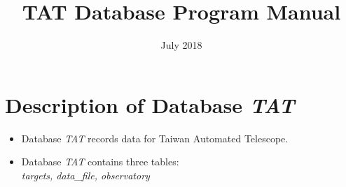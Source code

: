 \documentclass[12pt]{article}    %
\title{TAT Database Program Manual}  %
\date{July 2018}
\begin{document}
 \maketitle     %
 \newpage		 
	
 \tableofcontents	  %
 \newpage    
		
 \section{Description of Database {\it TAT}}

 \begin{itemize}
  \item Database {\it TAT} records data for Taiwan Automated Telescope.
  \item Database {\it TAT} contains three tables:\\
   {\it targets, data\_file, observatory}
 \end{itemize}
 	
\end{document}
